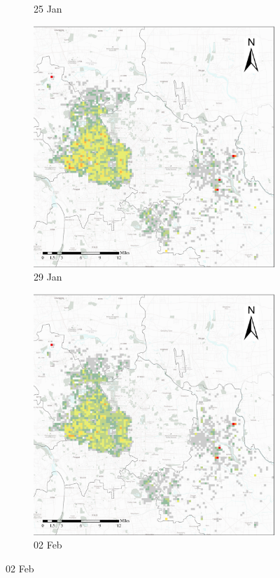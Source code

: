 \documentclass[preprints,ijgi,submit,moreauthors]{Definitions/mdpi}
\begin{document}
\begin{figure}[H]
\begin{subfigure}{.23\textwidth}
        \caption{25 Jan}
    \end{subfigure}
    \begin{subfigure}{.23\textwidth}
        \includegraphics[width=\textwidth]{Figures/Overall_spatial_patterns/FN5_D2020_01_29.eps}
        \caption{29 Jan}
    \end{subfigure}
        \begin{subfigure}{.23\textwidth}
        \includegraphics[width=\textwidth]{Figures/Overall_spatial_patterns/FN5_D2020_02_02.eps}
        \caption{02 Feb}
    \end{subfigure}
    

\end{figure}
\end{document}
